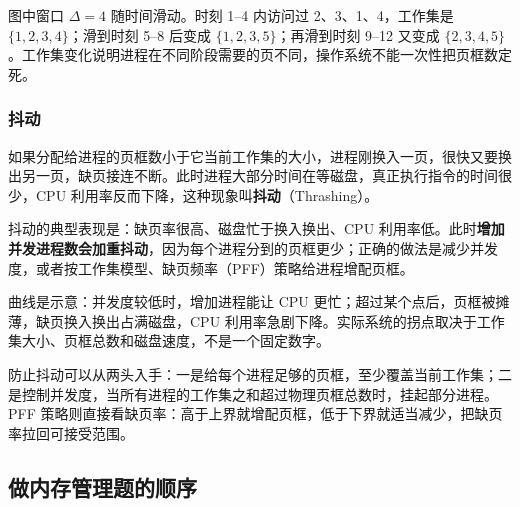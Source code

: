 图中窗口 $\Delta=4$ 随时间滑动。时刻 1--4 内访问过 2、3、1、4，工作集是 $\{1,2,3,4\}$；滑到时刻 5--8 后变成 $\{1,2,3,5\}$；再滑到时刻 9--12 又变成 $\{2,3,4,5\}$。工作集变化说明进程在不同阶段需要的页不同，操作系统不能一次性把页框数定死。

\subsubsection{抖动}

如果分配给进程的页框数小于它当前工作集的大小，进程刚换入一页，很快又要换出另一页，缺页接连不断。此时进程大部分时间在等磁盘，真正执行指令的时间很少，CPU 利用率反而下降，这种现象叫\textbf{抖动}（Thrashing）。

抖动的典型表现是：缺页率很高、磁盘忙于换入换出、CPU 利用率低。此时\textbf{增加并发进程数会加重抖动}，因为每个进程分到的页框更少；正确的做法是减少并发度，或者按工作集模型、缺页频率（PFF）策略给进程增配页框。

\begin{center}
\end{center}

曲线是示意：并发度较低时，增加进程能让 CPU 更忙；超过某个点后，页框被摊薄，缺页换入换出占满磁盘，CPU 利用率急剧下降。实际系统的拐点取决于工作集大小、页框总数和磁盘速度，不是一个固定数字。

防止抖动可以从两头入手：一是给每个进程足够的页框，至少覆盖当前工作集；二是控制并发度，当所有进程的工作集之和超过物理页框总数时，挂起部分进程。PFF 策略则直接看缺页率：高于上界就增配页框，低于下界就适当减少，把缺页率拉回可接受范围。

\subsection{做内存管理题的顺序}


